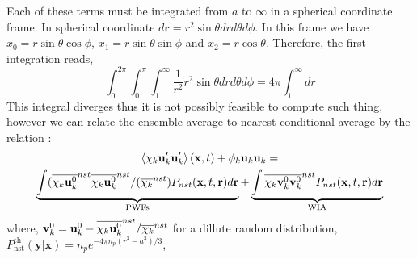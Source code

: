 Each of these terms must be integrated from $a$ to $\infty$ in a spherical coordinate frame. 
In spherical coordinate $d\textbf{r} = r^2 \sin\theta dr d\theta d\phi$. 
In this frame we have $x_0 = r \sin \theta \cos\phi$, $x_1 = r \sin \theta \sin\phi$ and $x_2 = r \cos\theta$.
Therefore, the first integration reads, 
\begin{equation*}
    \int_0^{2\pi} 
    \int_0^{\pi} 
    \int_1^{\infty} 
    \frac{1}{r^2} 
    r^2 \sin\theta dr d\theta d\phi
    = 
    4\pi 
    \int_1^\infty dr
\end{equation*}
This integral diverges thus it is not possibly feasible to compute such thing,
however we can relate the ensemble average to nearest conditional average by the relation : 
\begin{multline*}
    \left<\chi_k \textbf{u}'_k\textbf{u}'_k\right>(\textbf{x},t)
    + \phi_k \textbf{u}_k\textbf{u}_k
    = \\
    \underbrace{\int (\overline{\chi_k \textbf{u}^0_k}^{nst}  \overline{\chi_k \textbf{u}^0_k}^{nst} / (\overline{\chi_k}^{nst})  P_{nst}(\textbf{x},t,\textbf{r}) d\textbf{r} }_\text{PWFs}
    +\underbrace{\int \overline{\chi_k \textbf{v}_k^0\textbf{v}_k^0}^{nst}  P_{nst}(\textbf{x},t,\textbf{r}) d\textbf{r}}_\text{WIA}
    \label{eq:def_uu}
\end{multline*}
where, $\textbf{v}_k^0  = \textbf{u}_k^0 - \overline{\chi_k \textbf{u}^0_k}^{nst} / \overline{\chi_k}^{nst}$ 
for a dillute random distribution, $P_\text{nst}^\text{th}(\textbf{y}|\textbf{x}) = n_p e^{-4 \pi n_p (r^3 - a^3)/3}$,


